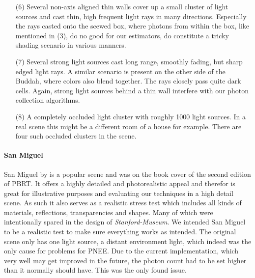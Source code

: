 \begin{itemize}
    \item[(6)] Several non-axis aligned thin walls cover up a small cluster of light sources and cast thin, high frequent light rays in many directions. Especially the rays casted onto the scewed box, where photons from within the box, like mentioned in (3), do no good for our estimators, do constitute a tricky shading scenario in various manners.
    \item[(7)] Several strong light sources cast long range, smoothly fading, but sharp edged light rays. A similar scenario is present on the other side of the Buddah, where colors also blend together. The rays closely pass quite dark cells. Again, strong light sources behind a thin wall interfere with our photon collection algorithms.
    \item[(8)] A completely occluded light cluster with roughly 1000 light sources. In a real scene this might be a different room of a house for example. There are four such occluded clusters in the scene.
\label{li:stanfordmuseum}
\end{itemize}
\paragraph{San Miguel}
\label{sec:sanmiguel}
San Miguel by \textcite{Sanmiguel} is a popular scene and was on the book cover of the second edition of PBRT. It offers a highly detailed and photorealistic appeal and therefor is great for illustrative purposes and evaluating our techniques in a high detail scene. As such it also serves as a realistic stress test which includes all kinds of materials, reflections, transparencies and shapes. Many of which were intentionally spared in the design of \textit{Stanford-Museum}. We intended San Miguel to be a realistic test to make sure everything works as intended. The original scene only has one light source, a distant environment light, which indeed was the only cause for problems for PNEE. Due to the current implementation, which very well may get improved in the future, the photon count had to be set higher than it normally should have. This was the only found issue.

